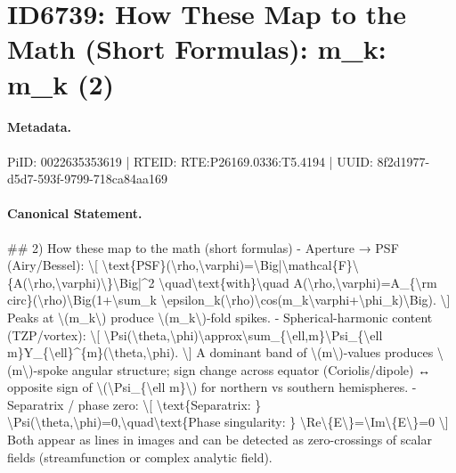 \section*{ID6739: How These Map to the Math (Short Formulas): m\_k: m\_k (2)}
\paragraph{Metadata.}
PiID: 0022635353619 | RTEID: RTE:P26169.0336:T5.4194 | UUID: 8f2d1977-d5d7-593f-9799-718ca84aa169

\paragraph{Canonical Statement.}
\#\# 2) How these map to the math (short formulas) - Aperture → PSF (Airy/Bessel): \textbackslash{}[ \textbackslash{}text\{PSF\}(\textbackslash{}rho,\textbackslash{}varphi)=\textbackslash{}Big|\textbackslash{}mathcal\{F\}\textbackslash{}\{A(\textbackslash{}rho,\textbackslash{}varphi)\textbackslash{}\}\textbackslash{}Big|\textasciicircum{}2 \textbackslash{}quad\textbackslash{}text\{with\}\textbackslash{}quad A(\textbackslash{}rho,\textbackslash{}varphi)=A\_\{\textbackslash{}rm circ\}(\textbackslash{}rho)\textbackslash{}Big(1+\textbackslash{}sum\_k \textbackslash{}epsilon\_k(\textbackslash{}rho)\textbackslash{}cos(m\_k\textbackslash{}varphi+\textbackslash{}phi\_k)\textbackslash{}Big). \textbackslash{}] Peaks at \textbackslash{}(m\_k\textbackslash{}) produce \textbackslash{}(m\_k\textbackslash{})-fold spikes. - Spherical-harmonic content (TZP/vortex): \textbackslash{}[ \textbackslash{}Psi(\textbackslash{}theta,\textbackslash{}phi)\textbackslash{}approx\textbackslash{}sum\_\{\textbackslash{}ell,m\}\textbackslash{}Psi\_\{\textbackslash{}ell m\}Y\_\{\textbackslash{}ell\}\textasciicircum{}\{m\}(\textbackslash{}theta,\textbackslash{}phi). \textbackslash{}] A dominant band of \textbackslash{}(m\textbackslash{})-values produces \textbackslash{}(m\textbackslash{})-spoke angular structure; sign change across equator (Coriolis/dipole) ↔ opposite sign of \textbackslash{}(\textbackslash{}Psi\_\{\textbackslash{}ell m\}\textbackslash{}) for northern vs southern hemispheres. - Separatrix / phase zero: \textbackslash{}[ \textbackslash{}text\{Separatrix: \} \textbackslash{}Psi(\textbackslash{}theta,\textbackslash{}phi)=0,\textbackslash{}quad\textbackslash{}text\{Phase singularity: \} \textbackslash{}Re\textbackslash{}\{E\textbackslash{}\}=\textbackslash{}Im\textbackslash{}\{E\textbackslash{}\}=0 \textbackslash{}] Both appear as lines in images and can be detected as zero-crossings of scalar fields (streamfunction or complex analytic field).

